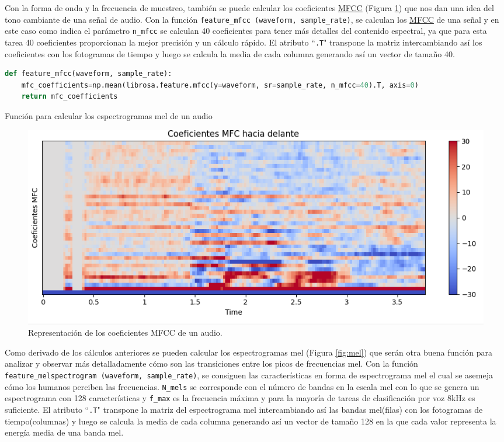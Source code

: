 Con la forma de onda y la frecuencia de muestreo, también se puede calcular los coeficientes \hyperlink{MFCC}{MFCC} (Figura \ref{fig:mfcc}) que nos dan una idea del tono cambiante de una señal de audio. Con la función \verb|feature_mfcc (waveform, sample_rate)|, se calculan los \hyperlink{MFCC}{MFCC} de una señal y en este caso como indica el parámetro \texttt{n\_mfcc} se calculan 40 coeficientes para tener más detalles del contenido espectral, ya que para esta tarea 40 coeficientes proporcionan la mejor precisión y un cálculo rápido. El atributo ``\texttt{.T}" transpone la matriz intercambiando así los coeficientes con los fotogramas de tiempo y luego se calcula la media de cada columna generando así un vector de tamaño 40.


\begin{code}[H]
\begin{lstlisting}[language=Python]
def feature_mfcc(waveform, sample_rate):
    mfc_coefficients=np.mean(librosa.feature.mfcc(y=waveform, sr=sample_rate, n_mfcc=40).T, axis=0)
    return mfc_coefficients
\end{lstlisting}
\caption[Función para calcular los espectrogramas mel de un audio]{Función para calcular los espectrogramas mel de un audio}
\label{cod:codejemplo5}
\end{code}

\begin{figure}[H]
  \centering
  \includegraphics[scale=0.4]{figs/coeficientes_mfc} %
  \caption{ Representación de los coeficientes MFCC de un audio.}
  \label{fig:mfcc}
\end{figure}

Como derivado de los cálculos anteriores se pueden calcular los espectrogramas mel (Figura \ref{fig:mel}) que serán otra buena función para analizar y observar más detalladamente cómo son las transiciones entre los picos de frecuencias mel. Con la función \verb|feature_melspectrogram (waveform, sample_rate)|, se consiguen las características en forma de espectrograma mel el cual se asemeja cómo los humanos perciben las frecuencias. \texttt{N\_mels} se corresponde con el número de bandas en la escala mel con lo que se genera un espectrograma con 128 características y \texttt{f\_max} es la frecuencia máxima y para la mayoría de tareas de clasificación por voz 8kHz es suficiente. El atributo ``\texttt{.T}" transpone la matriz del espectrograma mel intercambiando así las bandas mel(filas) con los fotogramas de tiempo(columnas) y luego se calcula la media de cada columna generando así un vector de tamaño 128 en la que cada valor representa la energía media de una banda mel.



